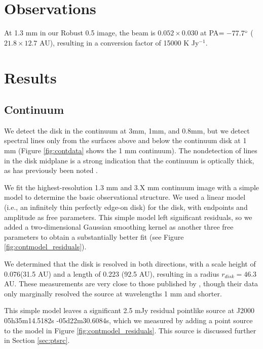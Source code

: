 \documentclass[twocolumn]{aastex61}
\begin{document}
\section{Observations}

At 1.3 mm in our Robust 0.5 image, the beam is $0.052\times0.030$ \arcsec at
PA$=-77.7^{\circ}$ ($21.8\times12.7$ AU), resulting in a 
conversion factor of 15000 K Jy$^{-1}$.

\section{Results}

\subsection{Continuum}
We detect the disk in the continuum at 3mm, 1mm, and 0.8mm, but we detect
spectral lines only from the surfaces above and below the continuum disk at 1
mm (Figure \ref{fig:contdata} shows the 1 mm continuum).  The nondetection of
lines in the disk midplane is a strong indication that the continuum is
optically thick, as has previously been noted
\citep[e.g.][]{Plambeck2016a}.

We fit the highest-resolution 1.3 mm and 3.X mm continuum image with a simple
model to determine the basic
observational structure.  We used a linear model (i.e., an infinitely thin
perfectly edge-on disk) for the disk, with endpoints and amplitude as free parameters.
This simple model left significant residuals, so we added a two-dimensional
Gaussian smoothing kernel as another three free parameters to obtain a
substantially better fit (see Figure \ref{fig:contmodel_residuals}).

We determined that the disk is resolved in both
directions, with a scale height of 0.076\arcsec (31.5 AU) and a length of 0.223
\arcsec (92.5 AU), resulting in a radius $r_{disk}=46.3$ AU.  These measurements
are very close to those published by \citet{Plambeck2016a}, though their data
only marginally resolved the source at wavelengths 1 mm and shorter.

This simple model leaves a significant 2.5 mJy residual pointlike source at
J2000 05h35m14.5182s -05d22m30.6084s, which we measured by adding a point
source to the model in Figure \ref{fig:contmodel_residuals}.
This source is discussed further in Section \ref{sec:ptsrc}.

\end{document}
